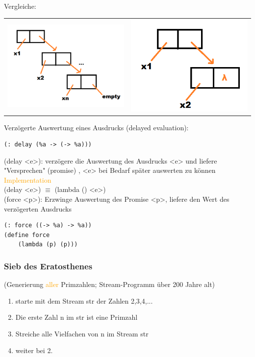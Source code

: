 \documentclass[paper=a4, fontsize=11pt]{scrartcl}
\numberwithin{equation}{section}
\numberwithin{figure}{section}
\numberwithin{table}{section}
\begin{document}
\begin{lstlistig}
Vergleiche: \\
\begin{tabular}{cc}
\includegraphics[width=7cm,height=5cm]{Listendarstellung.png} & 
\includegraphics[width=7cm,height=5cm]{Streamdarstellung.png}
\end{tabular}

Verzögerte Auswertung eines Ausdrucks (delayed evaluation):
\begin{lstlisting}
(: delay (%a -> (-> %a)))
\end{lstlisting}

(delay <e>): verzögere die Auswertung des Ausdrucks <e> und liefere "Versprechen" (promise) , <e>  bei Bedarf später auswerten zu können \\
\textcolor{orange}{Implementation}\\
(delay <e>) $\equiv$ (lambda () <e>) \\
(force <p>): Erzwinge Auswertung des Promise <p>, liefere den Wert des verzögerten Ausdrucks \\

\begin{lstlisting}
(: force ((-> %a) -> %a))
(define force
    (lambda (p) (p)))
\end{lstlisting}

\subsubsection{Sieb des Eratosthenes}
(Generierung \textcolor{orange}{aller} Primzahlen; Stream-Programm über 200 Jahre alt) \\
\begin{enumerate}
\item starte mit dem Stream str der Zahlen 2,3,4,...
\item Die erste Zahl n im str ist eine Primzahl
\item Streiche alle Vielfachen von n im Stream str
\item weiter bei 2.
\end{enumerate}


\end{lstlistig}
\end{document}
